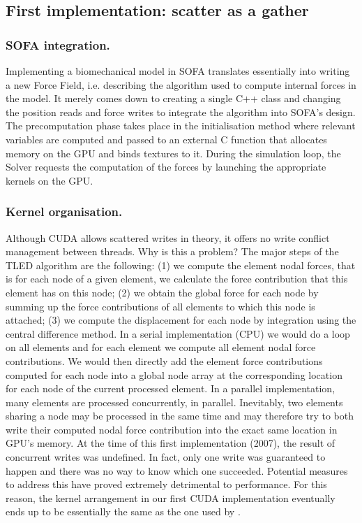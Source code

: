 	\subsection{First implementation: scatter as a gather}
	
\subsubsection*{SOFA integration.}
Implementing a biomechanical model in SOFA translates essentially into writing a new Force Field, i.e. describing the algorithm used to compute internal forces in the model. It merely comes down to creating a single C++ class and changing the position reads and force writes to integrate the algorithm into SOFA's design. The precomputation phase takes place in the initialisation method where relevant variables are computed and passed to an external C function that allocates memory on the GPU and binds textures to it. During the simulation loop, the Solver requests the computation of the forces by launching the appropriate kernels on the GPU.

\subsubsection*{Kernel organisation.}
Although CUDA allows scattered writes in theory, it offers no write conflict management between threads. Why is this a problem? The major steps of the TLED algorithm are the following: (1) we compute the element nodal forces, that is for each node of a given element, we calculate the force contribution that this element has on this node; (2) we obtain the global force for each node by summing up the force contributions of all elements to which this node is attached; (3) we compute the displacement for each node by integration using the central difference method. In a serial implementation (CPU) we would do a loop on all elements and for each element we compute all element nodal force contributions. We would then directly add the element force contributions computed for each node into a global node array at the corresponding location for each node of the current processed element. In a parallel implementation, many elements are processed concurrently, in parallel. Inevitably, two elements sharing a node may be processed in the same time and may therefore try to both write their computed nodal force contribution into the exact same location in GPU's memory. At the time of this first implementation (2007), the result of concurrent writes was undefined. In fact, only one write was guaranteed to happen and there was no way to know which one succeeded. Potential measures to address this have proved extremely detrimental to performance. For this reason, the kernel arrangement in our first CUDA implementation eventually ends up to be essentially the same as the one used by \cite{Taylor07b}.

